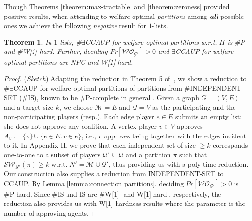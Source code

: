 \documentclass[letterpaper]{article}
\newtheorem{theorem}{Theorem}
\begin{document}
Though Theorems \ref{theorem:max-tractable} and \ref{theorem:zeroness} provided positive results, when attending to welfare-optimal \textit{partitions} among \textbf{\textit{all}} possible ones we achieve the following \textit{negative} result for $1$-lists.
\begin{theorem}
\label{theorem:max-intractable}
In $1$-lists, \#$\exists$CCAUP for welfare-optimal partitions w.r.t. $\Pi$ is \#P- and \#W[1]-hard. Further, deciding $Pr[\mathcal{WO}_{\mathcal{G}'}] > 0$ and $\exists$CCAUP for welfare-optimal partitions are NPC and W[1]-hard.
\end{theorem}
\begin{proof}
(\textit{Sketch}) Adapting the reduction in Theorem 5 of~\cite{peters2016complexity}, we show a reduction to \#$\exists$CCAUP for welfare-optimal partitions of partitions from \#INDEPENDENT-SET (\#IS), known to be \#P-complete in general \cite{provan1983complexity}. Given a graph $G = (V,E)$ and a target size $k$, we choose $\mathcal{M} = E$ and $\mathcal{Q} = V$ as the participating and the non-participating players (resp.). Each edge player $e \in E$ submits an empty list: she does not approve any coalition. A vertex player $v \in V$ approves $A_v := \{v\} \cup \{e \in E : v \in e\}$, i.e., $v$ approves being together with the edges incident to it.  In Appendix H, we prove that each independent set of size $\geq k$ corresponds one-to-one to a subset of players $\mathcal{Q}' \subseteq \mathcal{Q}$ and a partition $\pi$ such that $\mathcal{SW}_{N'}(\pi) \geq k$ w.r.t. $N' = \mathcal{M} \cup \mathcal{Q}'$, thus providing us with a poly-time reduction. Our construction also supplies a reduction from INDEPENDENT-SET to CCAUP. By Lemma \ref{lemma:connection partitions}, deciding $Pr[\mathcal{WO}_{\mathcal{G}'}] > 0$ is \#P-hard. %
Since \#IS and IS are \#W[1]- and W[1]-hard \cite{downey1995fixed,curticapean2019fixed}, respectively, the reduction also provides us with W[1]-hardness results where the parameter is the number of approving agents. %
\end{proof}
\end{document}
